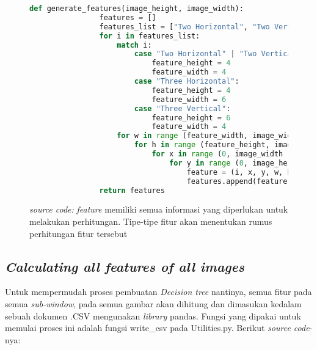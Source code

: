 	\begin{figure}[H]
		\begin{lstlisting}[language=Python, basicstyle=\tiny]
			def generate_features(image_height, image_width):
				features = []
				features_list = ["Two Horizontal", "Two Vertical", "Four Diagonal", "Right Triangular", "Left Triangular", "Three Horizontal", "Three Vertical"]
				for i in features_list:
					match i:
						case "Two Horizontal" | "Two Vertical" | "Four Diagonal" | "Right Triangular" | "Left Triangular":
							feature_height = 4
							feature_width = 4
						case "Three Horizontal":
							feature_height = 4
							feature_width = 6
						case "Three Vertical":
							feature_height = 6
							feature_width = 4
					for w in range (feature_width, image_width+1, feature_width):
						for h in range (feature_height, image_height+1, feature_height):
							for x in range (0, image_width - w):
								for y in range (0, image_height - h):
									feature = (i, x, y, w, h)
									features.append(feature)
    			return features
		\end{lstlisting}
		\caption{\emph{source code:} \textit{feature} memiliki semua informasi yang diperlukan 
		untuk melakukan perhitungan. Tipe-tipe fitur akan menentukan rumus perhitungan fitur tersebut}
		\label{code:generate features}
	\end{figure}

\subsection{\textit{Calculating all features of all images}}
	Untuk mempermudah proses pembuatan \emph{Decision tree} nantinya, semua fitur 
	pada semua \textit{sub-window}, pada semua gambar akan dihitung dan dimasukan 
	kedalam sebuah dokumen .CSV mengunakan \textit{library} pandas. Fungsi yang dipakai untuk memulai proses ini adalah 
	fungsi write\_csv pada Utilities.py. Berikut \emph{source code}-nya:

